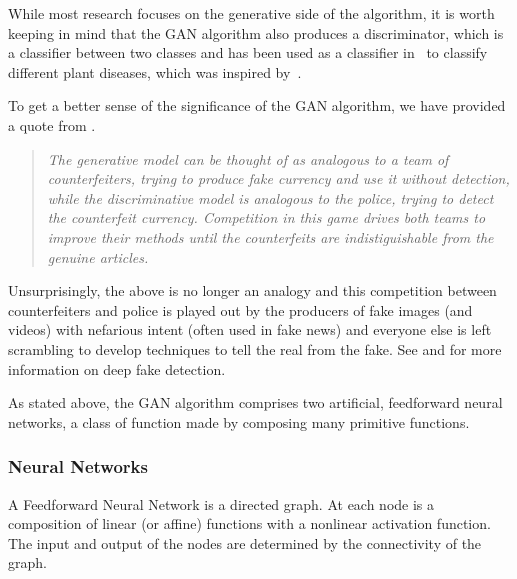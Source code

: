 While most research focuses on the generative side of the algorithm, it is worth
keeping in mind that the GAN algorithm also produces a discriminator, which is a
classifier between two classes and has been used as a classifier
in~\cite{ref:cortes-2017} to classify different plant diseases, which was
inspired by~\cite{ref:odena-2016}.

To get a better sense of the significance of the GAN algorithm, we have provided
a quote from \cite{ref:goodfellow-original}.

\begin{quote}
  \itshape
  The generative model can be thought of as analogous to a team of
  counterfeiters, trying to produce fake currency and use it without detection,
  while the discriminative model is analogous to the police, trying to detect
  the counterfeit currency. Competition in this game drives both teams to
  improve their methods until the counterfeits are indistiguishable from the
  genuine articles.
\end{quote}

Unsurprisingly, the above is no longer an analogy and this competition between
counterfeiters and police is played out by the producers of fake images (and
videos) with nefarious intent (often used in fake news) and everyone else is
left scrambling to develop techniques to tell the real from the fake. See
 \cite{ref:df8} and
\cite{ref:df9} for more information on deep fake detection.

As stated above, the GAN algorithm comprises two artificial, feedforward neural
networks, a class of function made by composing many primitive functions.

\subsubsection*{Neural Networks}

\begin{definition}
  A \textnormal{\sffamily Feedforward Neural Network} is a directed graph. At
  each node is a composition of linear (or affine) functions with a nonlinear
  activation function. The input and output of the nodes are determined by the
  connectivity of the graph.
\end{definition}

